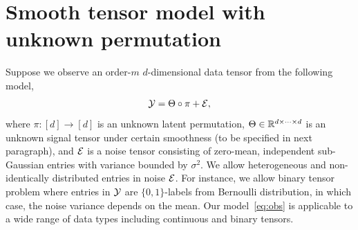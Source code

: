 \documentclass[11pt]{article}
\theoremstyle{definition}
\begin{document}
\section{Smooth tensor model with unknown permutation}\label{sec:model}
Suppose we observe an order-$m$ $d$-dimensional data tensor from the following model,
\begin{equation}\label{eq:obs}
\mathcal{Y}=\Theta\circ \pi+\mathcal{E},
\end{equation}
where $\pi\colon[d]\rightarrow[d]$ is an unknown latent permutation,  $\Theta\in \mathbb{R}^{d\times \cdots \times d}$ is an unknown signal tensor under certain smoothness (to be specified in next paragraph), and $\mathcal{E}$ is a noise tensor consisting of zero-mean, independent sub-Gaussian entries with variance bounded by $\sigma^2$. We allow heterogeneous and non-identically distributed entries in noise $\mathcal{E}$. For instance, we allow binary tensor problem where entries in $\mathcal{Y}$ are $\{0, 1\}$-labels from Bernoulli distribution, in which case, the noise variance depends on the mean. Our model~\eqref{eq:obs} is applicable to a wide range of data types including continuous and binary tensors. 
 
\end{document}
